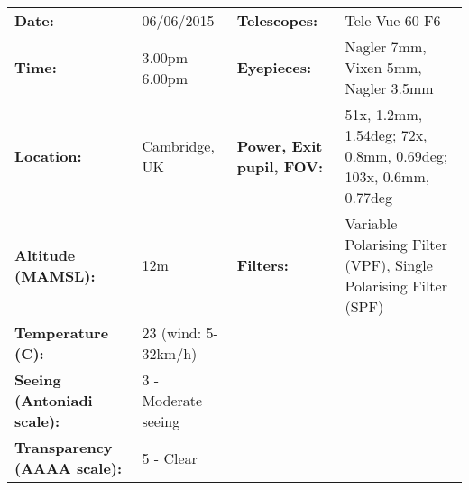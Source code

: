 \begin{tabular}{ p{1.7in} p{1.2in} p{1.5in} p{4.2in}}
{\bf Date:} & 06/06/2015 & {\bf Telescopes:} & Tele Vue 60 F6 \\ 
{\bf Time:} & 3.00pm-6.00pm & {\bf Eyepieces:} & Nagler 7mm, Vixen 5mm, Nagler 3.5mm \\ 
{\bf Location:} & Cambridge, UK & {\bf Power, Exit pupil, FOV:} & 51x, 1.2mm, 1.54deg; 72x, 0.8mm, 0.69deg; 103x, 0.6mm, 0.77deg \\ 
{\bf Altitude (MAMSL):} & 12m & {\bf Filters:} & Variable Polarising Filter (VPF), Single Polarising Filter (SPF) \\ 
{\bf Temperature (C):} & 23 (wind: 5-32km/h) & & \\ 
{\bf Seeing (Antoniadi scale):} & 3 - Moderate seeing & & \\ 
{\bf Transparency (AAAA scale):} & 5 - Clear & & \\ 
\end{tabular}
\centering 
